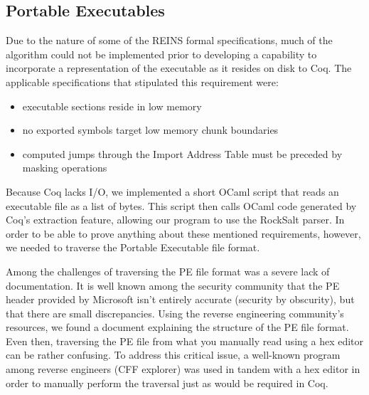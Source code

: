 \documentclass[conference]{IEEEtran}
\begin{document}

\subsection{Portable Executables}

Due to the nature of some of the REINS formal specifications, much of the algorithm could not be implemented prior to developing a capability to incorporate a representation of the executable as it resides on disk to Coq. The applicable specifications that stipulated this requirement were: 
\begin{itemize} 
\item executable sections reside in low memory 
\item no exported symbols target low memory chunk boundaries 
\item computed jumps through the Import Address Table must be preceded by masking operations
\end{itemize}

Because Coq lacks I/O, we implemented a short OCaml script that reads an executable file as a list of bytes. This script then calls OCaml code generated by Coq's extraction feature, allowing our program to use the RockSalt parser. In order to be able to prove anything about these mentioned requirements, however, we needed to traverse the Portable Executable file format. 

Among the challenges of traversing the PE file format was a severe lack of documentation. It is well known among the security community that the PE header provided by Microsoft isn't entirely accurate (security by obscurity), but that there are small discrepancies. Using the reverse engineering community's resources, we found a document explaining the structure of the PE file format\cite{PE:Misc}. Even then, traversing the PE file from what you manually read using a hex editor can be rather confusing. To address this critical issue, a well-known program among reverse engineers (CFF explorer) was used in tandem with a hex editor in order to manually perform the traversal just as would be required in Coq. 
\end{document}
